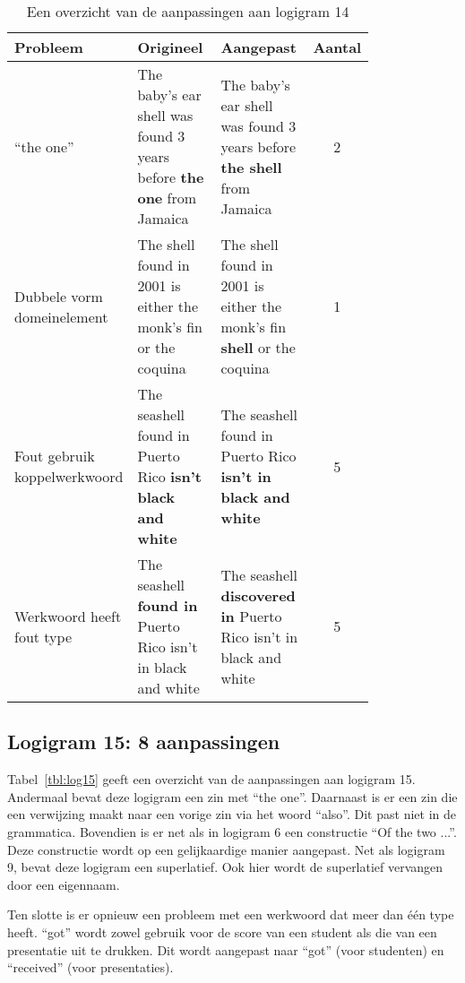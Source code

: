 \begin{table}[h]
  \centering
  \begin{tabular}{p{0.2\linewidth}p{0.3\linewidth}p{0.3\linewidth}c}
    \toprule
    \textbf{Probleem} & \textbf{Origineel} & \textbf{Aangepast} & \textbf{Aantal} \\ 
    \hline
    ``the one'' & The baby's ear shell was found 3 years before \textbf{the one} from Jamaica & The baby's ear shell was found 3 years before \textbf{the shell} from Jamaica & 2 \\
    \hline
    Dubbele vorm domeinelement & The shell found in 2001 is either the monk's fin or the coquina & The shell found in 2001 is either the monk's fin \textbf{shell} or the coquina & 1 \\
    \hline
    Fout gebruik koppelwerkwoord & The seashell found in Puerto Rico \textbf{isn't black and white} & The seashell found in Puerto Rico \textbf{isn't in black and white} & 5 \\
    \hline
    Werkwoord heeft fout type & The seashell \textbf{found in} Puerto Rico isn't in black and white & The seashell \textbf{discovered in} Puerto Rico isn't in black and white & 5 \\ 
    \bottomrule
  \end{tabular}
  \caption{Een overzicht van de aanpassingen aan logigram 14}
  \label{tbl:log14}
\end{table}

\subsection{Logigram 15: 8 aanpassingen}
Tabel~\ref{tbl:log15} geeft een overzicht van de aanpassingen aan logigram 15. Andermaal bevat deze logigram een zin met ``the one''. Daarnaast is er een zin die een verwijzing maakt naar een vorige zin via het woord ``also''. Dit past niet in de grammatica. Bovendien is er net als in logigram 6 een constructie ``Of the two ...''. Deze constructie wordt op een gelijkaardige manier aangepast. Net als logigram 9, bevat deze logigram een superlatief. Ook hier wordt de superlatief vervangen door een eigennaam.

Ten slotte is er opnieuw een probleem met een werkwoord dat meer dan één type heeft. ``got'' wordt zowel gebruik voor de score van een student als die van een presentatie uit te drukken. Dit wordt aangepast naar ``got'' (voor studenten) en ``received'' (voor presentaties).

